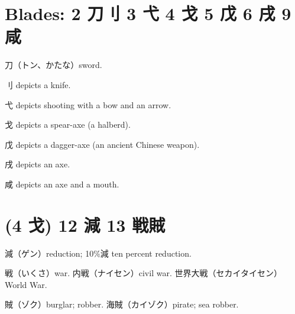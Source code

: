 \section{Blades: 2 刀刂 3 弋 4 戈 5 戊 6 戌 9 咸}

刀（トン、かたな）sword.

刂 depicts a knife.

弋 depicts shooting with a bow and an arrow.

戈 depicts a spear-axe (a halberd).

戊 depicts a dagger-axe (an ancient Chinese weapon).

戌 depicts an axe.

咸 depicts an axe and a mouth.

\section{(4 戈) 12 減 13 戦賊}

減（ゲン）reduction; 10\%減 ten percent reduction.

戦（いくさ）war.
内戦（ナイセン）civil war.
世界大戦（セカイタイセン）World War.

賊（ゾク）burglar; robber.
海賊（カイゾク）pirate; sea robber.

